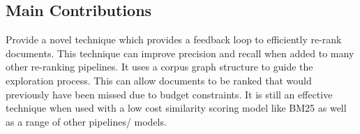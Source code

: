 \documentclass[sigconf,authorversion,nonacm]{acmart}
\begin{document}

\subsection{Main Contributions}

Provide a novel technique which provides a feedback loop to efficiently re-rank documents. This
technique can improve precision and recall when added to many other re-ranking pipelines. It uses a
corpus graph structure to guide the exploration process. This can allow documents to be ranked that
would previously have been missed due to budget constraints. It is still an effective technique when
used with a low cost similarity scoring model like BM25 as well as a range of other pipelines/
models.




\end{document}
